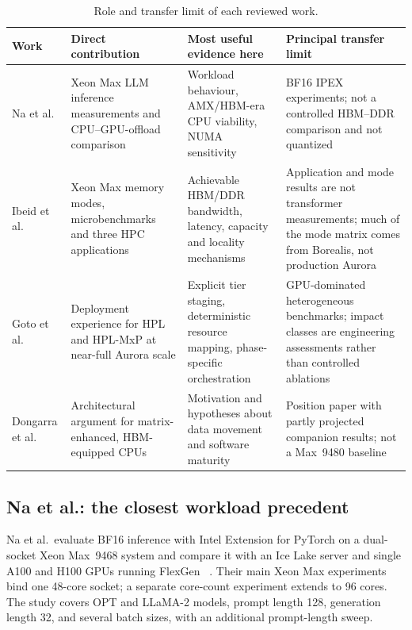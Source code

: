 \begin{table}[htbp]
\centering
\small
\caption{Role and transfer limit of each reviewed work.}
\label{tab:corpus-roles}
\begin{tabularx}{\textwidth}{@{}P{2.55cm}YYP{3.35cm}@{}}
\toprule
\textbf{Work} & \textbf{Direct contribution} &
\textbf{Most useful evidence here} & \textbf{Principal transfer limit} \\
\midrule
Na et al.\ \cite{na2024llmcpu}
& Xeon Max LLM inference measurements and CPU--GPU-offload comparison
& Workload behaviour, AMX/HBM-era CPU viability, NUMA sensitivity
& BF16 IPEX experiments; not a controlled HBM--DDR comparison and not
  quantized \lcpp{} \\
\addlinespace
Ibeid et al.\ \cite{ibeid2025aurora}
& Xeon Max memory modes, microbenchmarks and three HPC applications
& Achievable HBM/DDR bandwidth, latency, capacity and locality mechanisms
& Application and mode results are not transformer measurements; much
  of the mode matrix comes from Borealis, not production Aurora \\
\addlinespace
Goto et al.\ \cite{goto2026aurorahpl}
& Deployment experience for HPL and HPL-MxP at near-full Aurora scale
& Explicit tier staging, deterministic resource mapping, phase-specific
  orchestration
& GPU-dominated heterogeneous benchmarks; impact classes are engineering
  assessments rather than controlled ablations \\
\addlinespace
Dongarra et al.\ \cite{dongarra2026gpus}
& Architectural argument for matrix-enhanced, HBM-equipped CPUs
& Motivation and hypotheses about data movement and software maturity
& Position paper with partly projected companion results; not a Max~9480
  baseline \\
\bottomrule
\end{tabularx}
\end{table}

\subsection{Na et al.: the closest workload precedent}
\label{sec:na-critical}

Na et al.\ evaluate BF16 inference with Intel Extension for PyTorch on
a dual-socket Xeon Max~9468 system and compare it with an Ice Lake
server and single A100 and H100 GPUs running FlexGen
~\cite{na2024llmcpu}.  Their main Xeon Max experiments bind one
48-core socket; a separate core-count experiment extends to 96 cores.
The study covers OPT and LLaMA-2 models, prompt length 128, generation
length 32, and several batch sizes, with an additional prompt-length
sweep.

